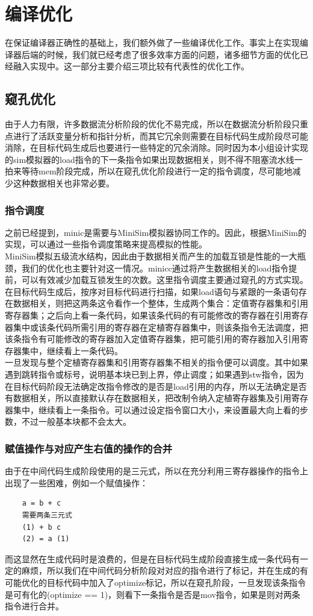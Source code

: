 \documentclass[12pt,a4paper,Flow]{report}
\begin{document}
\chapter{编译优化}
在保证编译器正确性的基础上，我们额外做了一些编译优化工作。事实上在实现编译器后端的时候，我们就已经考虑了很多效率方面的问题，诸多细节方面的优化已经融入实现中。这一部分主要介绍三项比较有代表性的优化工作。
\newpage
\section{窥孔优化}
由于人力有限，许多数据流分析阶段的优化不易完成，所以在数据流分析阶段只重点进行了活跃变量分析和指针分析，而其它冗余则需要在目标代码生成阶段尽可能消除，在目标代码生成后也要进行一些特定的冗余消除。同时因为本小组设计实现的sim模拟器的load指令的下一条指令如果出现数据相关，则不得不阻塞流水线一拍来等待mem阶段完成，所以在窥孔优化阶段进行一定的指令调度，尽可能地减少这种数据相关也非常必要。
\subsection{指令调度}
之前已经提到，minic是需要与MiniSim模拟器协同工作的。因此，根据MiniSim的实现，可以通过一些指令调度策略来提高模拟的性能。\\
\indent MiniSim模拟五级流水结构，因此由于数据相关而产生的加载互锁是性能的一大瓶颈，我们的优化也主要针对这一情况。minicc通过将产生数据相关的load指令提前，可以有效减少加载互锁发生的次数。这里指令调度主要通过窥孔的方式实现。\\
\indent 在目标代码生成后，按序对目标代码进行扫描，如果load语句与紧跟的一条语句存在数据相关，则把这两条这令看作一个整体，生成两个集合：定值寄存器集和引用寄存器集；之后向上看一条代码，如果该条代码的有可能修改的寄存器在引用寄存器集中或该条代码所需引用的寄存器在定植寄存器集中，则该条指令无法调度，把该条指令有可能修改的寄存器加入定值寄存器集，把可能引用的寄存器加入引用寄存器集中，继续看上一条代码。\\
\indent 一旦发现与整个定植寄存器集和引用寄存器集不相关的指令便可以调度。其中如果遇到跳转指令或标号，说明基本块已到上界，停止调度；如果遇到stw指令，因为在目标代码阶段无法确定改指令修改的是否是load引用的内存，所以无法确定是否有数据相关，所以直接默认存在数据相关，把改制令纳入定植寄存器集及引用寄存器集中，继续看上一条指令。可以通过设定指令窗口大小，来设置最大向上看的步数，不过一般基本块都不会太大。
\subsection{赋值操作与对应产生右值的操作的合并}
由于在中间代码生成阶段使用的是三元式，所以在充分利用三寄存器操作的指令上出现了一些困难，例如一个赋值操作：
\begin{verbatim}
	a = b + c
	需要两条三元式
	(1) + b c
	(2) = a (1)
\end{verbatim}
而这显然在生成代码时是浪费的，但是在目标代码生成阶段直接生成一条代码有一定的麻烦，所以我们在中间代码分析阶段对对应的指令进行了标记，并在生成的有可能优化的目标代码中加入了optimize标记，所以在窥孔阶段，一旦发现该条指令是可有化的(optimize == 1)，则看下一条指令是否是mov指令，如果是则对两条指令进行合并。
\end{document}
